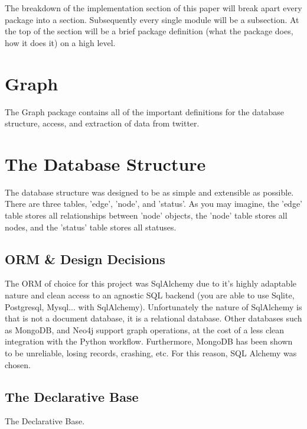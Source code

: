 The breakdown of the implementation section of this paper will break apart every package into a section. Subsequently every single module will be a subsection. At the top of the section will be a brief package definition (what the package does, how it does it) on a high level.
\section{Graph}
The Graph package contains all of the important definitions for the database structure, access, and extraction of data from twitter.
\section{The Database Structure}
The database structure was designed to be as simple and extensible as possible. There are three tables, 'edge', 'node', and 'status'. As you may imagine, the 'edge' table stores all relationships between 'node' objects, the 'node' table stores all nodes, and the 'status' table stores all statuses.
\subsection{ORM \& Design Decisions}
The ORM of choice for this project was SqlAlchemy due to it's highly adaptable nature and clean access to an agnostic SQL backend (you are able to use Sqlite, Postgresql, Mysql... with SqlAlchemy). Unfortunately the nature of SqlAlchemy is that is not a document database, it is a relational database. Other databases such as MongoDB, and Neo4j support graph operations, at the cost of a less clean integration with the Python workflow. Furthermore, MongoDB has been shown to be unreliable, losing records, crashing, etc. For this reason, SQL Alchemy was chosen.
\subsection{The Declarative Base}
The Declarative Base.
\\
\\
